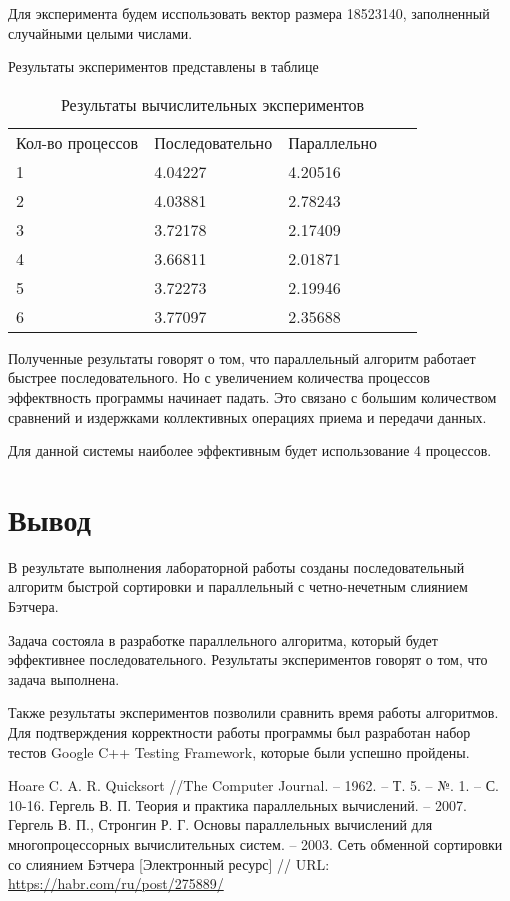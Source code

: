\documentclass{report}
\begin{document}
\par Для эксперимента будем исспользовать вектор размера 18523140, заполненный случайными целыми числами. 
\par Результаты экспериментов представлены в таблице
\begin{table}[!h]
\caption{Результаты вычислительных экспериментов}
\centering
\begin{tabular}{lllll}
Кол-во процессов  & Последовательно & Параллельно \\
1      & 4.04227         & 4.20516  \\
2     & 4.03881         & 2.78243  \\
3     & 3.72178         & 2.17409 \\
4     & 3.66811        & 2.01871 \\
5     &3.72273         & 2.19946  \\
6     &3.77097         & 2.35688  

\end{tabular}
\end{table}

\par Полученные результаты говорят о том, что параллельный алгоритм работает быстрее последовательного. Но с увеличением количества процессов эффектвность программы начинает падать. Это связано с большим количеством сравнений и издержками коллективных операциях приема и передачи данных.
\par Для данной системы наиболее эффективным будет использование 4 процессов.
\newpage

\section*{Вывод}
В результате выполнения лабораторной работы созданы последовательный алгоритм быстрой сортировки и параллельный с четно-нечетным слиянием Бэтчера.
\par Задача состояла в разработке параллельного алгоритма, который будет эффективнее последовательного. Результаты экспериментов говорят о том, что задача выполнена.
\par Также результаты экспериментов позволили сравнить время работы алгоритмов. Для подтверждения корректности работы программы был разработан набор тестов Google C++
Testing Framework, которые были успешно пройдены.

\newpage

\begin{thebibliography}{1}
Hoare C. A. R. Quicksort //The Computer Journal. – 1962. – Т. 5. – №. 1. – С. 10-16.
Гергель В. П. Теория и практика параллельных вычислений. – 2007. 
Гергель В. П., Стронгин Р. Г. Основы параллельных вычислений для многопроцессорных вычислительных систем. – 2003.
 Сеть обменной сортировки со слиянием Бэтчера [Электронный ресурс] // URL: \url{https://habr.com/ru/post/275889/}
\end{thebibliography}
\newpage
\end{document}
